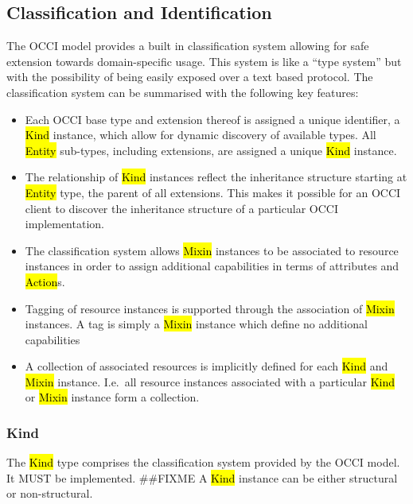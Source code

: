\documentclass[10pt,a4paper,british]{article}
\begin{document}
\subsection{Classification and Identification}
\label{sec:classification}
The OCCI model provides a built in classification system allowing for safe
extension towards domain-specific usage. This system is like a ``type system''
but with the possibility of being easily exposed over a text based protocol.
%
The classification system can be summarised with the following key features:
\begin{itemize}
\item Each OCCI base type and extension thereof is assigned a unique
 identifier, a \hl{Kind} instance, which allow for dynamic discovery of
 available types. All \hl{Entity} sub-types, including extensions, are assigned
 a unique \hl{Kind} instance.
\item The relationship of \hl{Kind} instances reflect the inheritance structure
 starting at \hl{Entity} type, the parent of all extensions. This makes it
 possible for an OCCI client to discover the inheritance structure of a
 particular OCCI implementation.
\item The classification system allows \hl{Mixin} instances to be associated
 to resource instances in order to assign additional capabilities in terms of
 attributes and \hl{Action}s.
\item Tagging of resource instances is supported through the association
 of \hl{Mixin} instances. A tag is simply a \hl{Mixin} instance which define no
 additional capabilities
\item A collection of associated resources is implicitly defined for each
 \hl{Kind} and \hl{Mixin} instance. I.e.~all resource instances associated with
 a particular \hl{Kind} or \hl{Mixin} instance form a collection.
\end{itemize}

\subsubsection{Kind}
\label{sec:type}
The \hl{Kind} type comprises the classification system provided by the OCCI
model. It MUST be implemented.
\#\#FIXME
A \hl{Kind} instance can be either structural or
non-structural.
\end{document}

